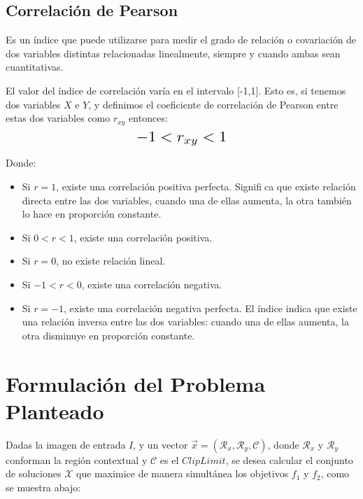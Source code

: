\documentclass[spanish,twocolumn]{article}
\begin{document}
\subsection{Correlación de Pearson}
\label{ssec:correlacion}
Es un índice que puede utilizarse para medir el grado de relación o covariación de dos variables distintas relacionadas linealmente,  siempre y cuando ambas sean cuantitativas.

El valor del  índice de correlación varía en el intervalo [-1,1]. Esto es, si tenemos dos variables $X$ e $Y$, y definimos el coeficiente de correlación de Pearson entre estas dos variables como $r_{xy}$ entonces: 
\begin{equation}\label{eq:gm}
\resizebox{.3\hsize}{!}
{
$-1<r_{xy}<1$ 
}
\end{equation}

Donde:
\begin{itemize}
\item Si $r = 1$, existe una correlación positiva perfecta. Significa que existe relación directa entre las dos variables, cuando una de ellas aumenta, la otra también lo hace en proporción constante.
\item Si $0<r<1$, existe una correlación positiva.
\item Si $r = 0$, no existe relación lineal.
\item Si $-1<r<0$, existe una correlación negativa.
\item Si $r = -1$, existe una correlación negativa perfecta. El índice indica que existe una relación inversa entre las dos variables: cuando una de ellas aumenta, la otra disminuye en proporción constante.
\end{itemize}

\section{Formulación del Problema Planteado}
\label{sec:formulacion}
Dadas la imagen de entrada $I$, y un vector $\overrightarrow{x}=(\mathcal{R}_x, \mathcal{R}_y, \mathcal{C})$, donde $\mathcal{R}_x$ y $\mathcal{R}_y$ conforman la región contextual y $\mathscr{C}$ es el $Clip Limit$, se desea calcular el conjunto de soluciones $\mathscr{X}$ que maximice de manera simultánea los objetivos $f_1$ y $f_2$, como se muestra abajo:
\end{document}
